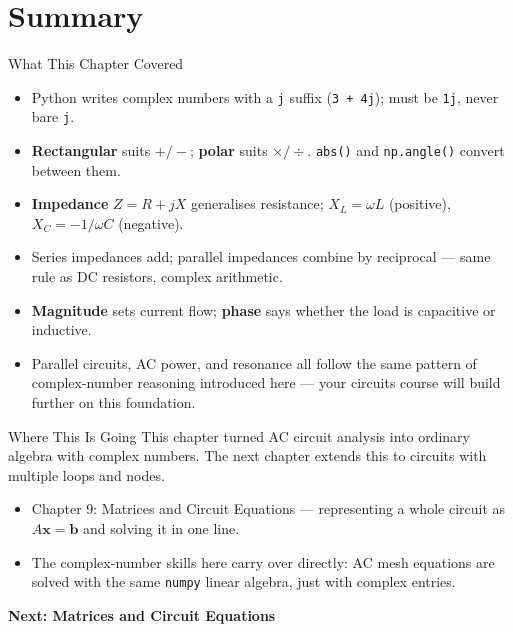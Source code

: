 \documentclass[9pt,aspectratio=169,xcolor=table]{beamer}
\begin{document}
\section{Summary}

\begin{frame}{What This Chapter Covered}
    \leavevmode
    \small
    \begin{itemize}
        \item Python writes complex numbers with a \texttt{j} suffix
              (\texttt{3 + 4j}); must be \texttt{1j}, never bare
              \texttt{j}.
        \item \textbf{Rectangular} suits $+/-$; \textbf{polar} suits
              $\times/\div$. \texttt{abs()} and \texttt{np.angle()}
              convert between them.
        \item \textbf{Impedance} $Z = R + jX$ generalises resistance;
              $X_L = \omega L$ (positive), $X_C = -1/\omega C$
              (negative).
        \item Series impedances \alert{add}; parallel impedances
              combine by \alert{reciprocal} --- same rule as DC
              resistors, complex arithmetic.
        \item \textbf{Magnitude} sets current flow; \textbf{phase}
              says whether the load is capacitive or inductive.
        \item Parallel circuits, AC power, and resonance all follow the
              same pattern of complex-number reasoning introduced
              here --- your circuits course will build further on this
              foundation.
    \end{itemize}
\end{frame}

\begin{frame}{Where This Is Going}
    \leavevmode
    \small
    This chapter turned AC circuit analysis into ordinary algebra with
    complex numbers. The next chapter extends this to circuits with
    \alert{multiple} loops and nodes.

    \vspace{3mm}
    \begin{itemize}
        \item Chapter 9: Matrices and Circuit Equations ---
              representing a whole circuit as $A\mathbf{x} = \mathbf{b}$
              and solving it in one line.
        \item The complex-number skills here carry over directly: AC
              mesh equations are solved with the same \texttt{numpy}
              linear algebra, just with complex entries.
    \end{itemize}

    \vspace{4mm}
    \begin{center}
        \large\color{primary}\textbf{Next: Matrices and Circuit Equations}
    \end{center}
\end{frame}
\end{document}
